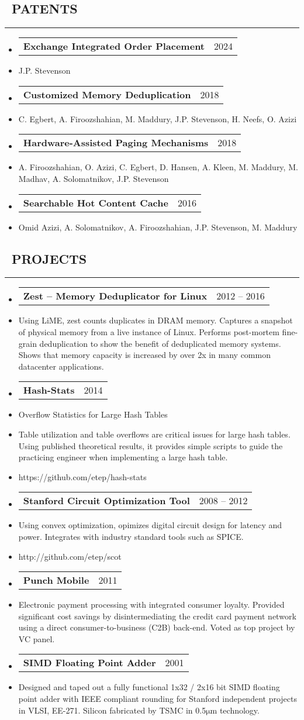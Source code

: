 \documentclass[10pt,letterpaper]{article}
\makeatletter
\newenvironment{resumesection}[1]
{%
    \subsection*{\ \textcolor{light-gray}{#1} }
    \vspace{-0.4em}
    \begin{samepage}
    \hrule
    \end{samepage}
    \vspace{+0.4em}
    \begin{itemize}[leftmargin=0.15cm]
        \parskip=0.1em
}%
{%
    \end{itemize}
}%
\newcommand{\myitem}[1] {
    \item[] \textcolor{dark-gray}{#1}
}
\newcommand{\headerbi}[2] {
    \item[] \begin{tabular*}{\linewidth}{l@{\extracolsep{\fill}}r}
    \textbf{#1} & #2 \\
    \end{tabular*}
}
\newcommand{\rminiw}{0.550}
\makeatother
\begin{document}
\begin{minipage}[t]{\rminiw\textwidth}
    \begin{resumesection}{PATENTS}
        \headerbi{Exchange Integrated Order Placement}{2024}
        \myitem{J.P. Stevenson}
        \headerbi{Customized Memory Deduplication}{2018}
        \myitem{C. Egbert, A. Firoozshahian, M. Maddury, J.P. Stevenson, H. Neefs, O. Azizi}
        \headerbi{Hardware-Assisted Paging Mechanisms}{2018}
        \myitem{A. Firoozshahian, O. Azizi, C. Egbert, D. Hansen, A. Kleen, M. Maddury, M. Madhav, A. Solomatnikov, J.P. Stevenson}
        \headerbi{Searchable Hot Content Cache}{2016}
        \myitem{Omid Azizi, A. Solomatnikov, A. Firoozshahian, J.P. Stevenson, M. Maddury}
    \end{resumesection}
\begin{resumesection}{PROJECTS}
    \headerbi{Zest -- Memory Deduplicator for Linux}{2012 -- 2016}
    \myitem{
        Using LiME, zest counts duplicates in DRAM memory.
        Captures a snapshot of physical memory from a live instance of Linux.
        Performs post-mortem fine-grain deduplication to show the benefit of deduplicated memory systems.
        Shows that memory capacity is increased by over 2x in many common datacenter applications.
    }
    \headerbi{Hash-Stats}{2014}
    \myitem{Overflow Statistics for Large Hash Tables}
    \myitem{
        Table utilization and table overflows are critical issues for large hash tables.
        Using published theoretical results, it provides simple scripts to guide the practicing engineer when implementing a large hash table.
    }
    \myitem{https://github.com/etep/hash-stats}
    \headerbi{Stanford Circuit Optimization Tool}{2008 -- 2012}
    \myitem{
        Using convex optimization, opimizes digital circuit design for latency and power.
        Integrates with industry standard tools such as SPICE.
    }
    \myitem{http://github.com/etep/scot}
    \headerbi{Punch Mobile}{2011}
    \myitem{
        Electronic payment processing with integrated consumer loyalty.
        Provided significant cost savings by disintermediating the credit card payment network using a direct consumer-to-business (C2B) back-end.
        Voted as top project by VC panel.
    }
    \headerbi{SIMD Floating Point Adder}{2001}
    \myitem{
        Designed and taped out a fully functional 1x32 / 2x16 bit
        SIMD floating point adder with IEEE compliant rounding
        for Stanford independent projects in VLSI, EE-271.
        Silicon fabricated by TSMC in 0.5$\mathrm{ \mu m}$ technology.
    }
\end{resumesection}
\end{minipage}
\end{document}
